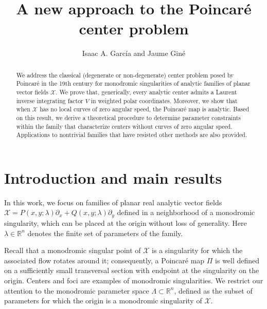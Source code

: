 \documentclass[12pt]{amsart}
\title[The Poincar\'e center problem]{A new approach to the Poincar\'e center problem}
\author[Isaac A. Garc\'ia and Jaume Gin\'e]{Isaac A. Garc\'ia and Jaume Gin\'e}
\begin{document}
\begin{abstract}
We address the classical (degenerate or non-degenerate) center problem posed by Poincar\'e in the 19th century for monodromic singularities of analytic families of planar vector fields $\mathcal{X}$. We prove that, generically, every analytic center admits a Laurent inverse integrating factor $V$ in weighted polar coordinates. Moreover, we show that when $\mathcal{X}$ has no local curves of zero angular speed, the Poincar\'e map is analytic. Based on this result, we derive a theoretical procedure to determine parameter constraints within the family that characterize centers without curves of zero angular speed. Applications to nontrivial families that have resisted other methods are also provided.
\end{abstract}

\maketitle

\section{Introduction and main results}

In this work, we focus on families of planar real analytic vector fields
$\mathcal{X} = P(x,y; \lambda) \partial_x + Q(x,y; \lambda) \partial_y$
defined in a neighborhood of a monodromic singularity, which can be placed at the origin without loss of generality. Here $\lambda \in \mathbb{R}^n$ denotes the finite set of parameters of the family.

Recall that a monodromic singular point of $\mathcal{X}$ is a singularity for which the associated flow rotates around it; consequently, a Poincar\'e map $\Pi$ is well defined on a sufficiently small transversal section with endpoint at the singularity on the origin. Centers and foci are examples of monodromic singularities. We restrict our attention to the monodromic parameter space $\Lambda \subset \mathbb{R}^n$, defined as the subset of parameters for which the origin is a monodromic singularity of $\mathcal{X}$.
\end{document}
